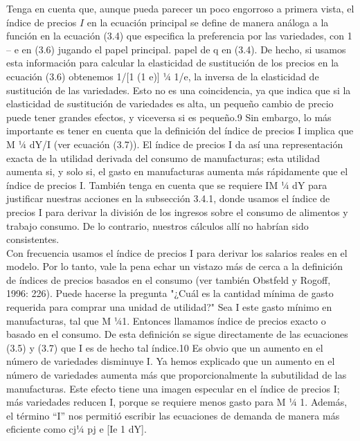 Tenga en cuenta que, aunque pueda parecer un poco engorroso a primera vista, el índice de precios $I$ en la ecuación principal se define de manera análoga a la función en la ecuación (3.4) que especifica la preferencia por las variedades, con 1 – e en (3.6) jugando el papel principal. papel de q en (3.4). De hecho, si usamos esta información para calcular la elasticidad de sustitución de los precios en la ecuación (3.6) obtenemos 1/[1 (1 e)] ¼ 1/e, la inversa de la elasticidad de sustitución de las variedades. Esto no es una coincidencia, ya que indica que si la elasticidad de sustitución de variedades es alta, un pequeño cambio de precio puede tener grandes efectos, y viceversa si es pequeño.9 Sin embargo, lo más importante es tener en cuenta que la definición del índice de precios I implica que M ¼ dY/I (ver ecuación (3.7)). El índice de precios I da así una representación exacta de la utilidad derivada del consumo de manufacturas; esta utilidad aumenta si, y solo si, el gasto en manufacturas aumenta más rápidamente que el índice de precios I. También tenga en cuenta que se requiere IM ¼ dY para justificar nuestras acciones en la subsección 3.4.1, donde usamos el índice de precios I para derivar la división de los ingresos sobre el consumo de alimentos y trabajo consumo. De lo contrario, nuestros cálculos allí no habrían sido consistentes.\\
Con frecuencia usamos el índice de precios I para derivar los salarios reales en el modelo. Por lo tanto, vale la pena echar un vistazo más de cerca a la definición de índices de precios basados ​​en el consumo (ver también Obstfeld y Rogoff, 1996: 226). Puede hacerse la pregunta "¿Cuál es la cantidad mínima de gasto requerida para comprar una unidad de utilidad?" Sea I este gasto mínimo en manufacturas, tal que M ¼1. Entonces llamamos índice de precios exacto o basado en el consumo. De esta definición se sigue directamente de las ecuaciones (3.5) y (3.7) que I es de hecho tal índice.10 Es obvio que un aumento en el número de variedades disminuye I. Ya hemos explicado que un aumento en el número de variedades aumenta más que proporcionalmente la subutilidad de las manufacturas. Este efecto tiene una imagen especular en el índice de precios I; más variedades reducen I, porque se requiere menos gasto para M ¼ 1. Además, el término “I” nos permitió escribir las ecuaciones de demanda de manera más eficiente como cj¼ pj e [Ie 1 dY].\\
